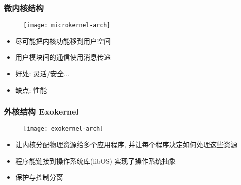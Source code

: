 \begin{frame}[plain]
	
	\frametitle{微内核结构}
	
	\begin{figure}
		\centering
		\texttt{[image: microkernel-arch]}
	\end{figure}
	
	\begin{itemize}
		\item 尽可能把内核功能移到用户空间
		\item 用户模块间的通信使用消息传递 %
		\item 好处: 灵活/安全...
		\item 缺点: 性能
	\end{itemize}

\end{frame}

\begin{frame}
	
	\frametitle{外核结构 Exokernel}
	
	\begin{figure}
		\centering
		\texttt{[image: exokernel-arch]}
	\end{figure}

	\begin{itemize}
		\item 让内核分配物理资源给多个应用程序, 并让每个程序决定如何处理这些资源
		\item 程序能链接到操作系统库(libOS) 实现了操作系统抽象
		\item 保护与控制分离
	\end{itemize}
	
\end{frame}

